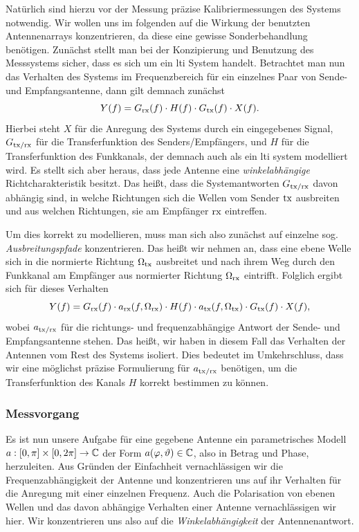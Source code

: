 Nat\"urlich sind hierzu vor der Messung pr\"azise Kalibriermessungen des Systems notwendig. Wir wollen uns im folgenden auf die Wirkung der benutzten Antennenarrays konzentrieren, da diese eine gewisse Sonderbehandlung ben\"otigen. Zun\"achst stellt man bei der Konzipierung und Benutzung des Messsystems sicher, dass es sich um ein \gls{lti} System handelt. Betrachtet man nun das Verhalten des Systems im Frequenzbereich f\"ur ein einzelnes Paar von Sende- und Empfangsantenne, dann gilt demnach zun\"achst
\begin{equation}
    Y(f) = G_{\rm rx}(f) \cdot H(f) \cdot G_{\rm tx}(f) \cdot X(f).
\end{equation}
Hierbei steht $X$ f\"ur die Anregung des Systems durch ein eingegebenes Signal, $G_{\rm tx/\rm rx}$ f\"ur die Transferfunktion des Senders/Empf\"angers, und $H$ f\"ur die Transferfunktion des Funkkanals, der demnach auch als ein \gls{lti} system modelliert wird. Es stellt sich aber heraus, dass jede Antenne eine \emph{winkelabh\"angige} Richtcharakteristik besitzt. Das hei{\ss}t, dass die Systemantworten $G_{\rm tx/\rm rx}$ davon abh\"angig sind, in welche Richtungen sich die Wellen vom Sender $\rm tx$ ausbreiten und aus welchen Richtungen, sie am Empf\"anger $\rm rx$ eintreffen. 

Um dies korrekt zu modellieren, muss man sich also zun\"achst auf einzelne sog. \emph{Ausbreitungspfade} konzentrieren. Das hei{\ss}t wir nehmen an, dass eine ebene Welle sich in die normierte Richtung $\Omega_{\rm tx}$ ausbreitet und nach ihrem Weg durch den Funkkanal am Empf\"anger aus normierter Richtung $\Omega_{\rm rx}$ eintrifft. Folglich ergibt sich f\"ur dieses Verhalten
\begin{equation}
    Y(f) = 
        G_{\rm rx}(f) \cdot a_{\rm rx}(f, \Omega_{\rm rx})
        \cdot H(f) 
        \cdot a_{\rm tx}(f, \Omega_{\rm tx}) \cdot G_{\rm tx}(f)
        \cdot X(f),
\end{equation}
%
wobei $a_{\rm tx/\rm rx}$ f\"ur die richtungs- und frequenzabh\"angige Antwort der Sende- und Empfangsantenne stehen. Das hei{\ss}t, wir haben in diesem Fall das Verhalten der Antennen vom Rest des Systems isoliert. Dies bedeutet im Umkehrschluss, dass wir eine m\"oglichst pr\"azise Formulierung f\"ur $a_{\rm tx/\rm rx}$ ben\"otigen, um die Transferfunktion des Kanals $H$ korrekt bestimmen zu k\"onnen.
%
%
%
\subsubsection{Messvorgang}
%
%
Es ist nun unsere Aufgabe f\"ur eine gegebene Antenne ein parametrisches Modell $a: [0, \pi] \times [0, 2\pi] \rightarrow \mathbb{C}$ der Form $a(\varphi, \vartheta) \in \mathbb{C}$, also in Betrag und Phase, herzuleiten. Aus Gr\"unden der Einfachheit vernachl\"assigen wir die Frequenzabh\"angigkeit der Antenne und konzentrieren uns auf ihr Verhalten f\"ur die Anregung mit einer einzelnen Frequenz. Auch die Polarisation von ebenen Wellen und das davon abh\"angige Verhalten einer Antenne vernachl\"assigen wir hier. Wir konzentrieren uns also auf die \emph{Winkelabh\"angigkeit} der Antennenantwort.

